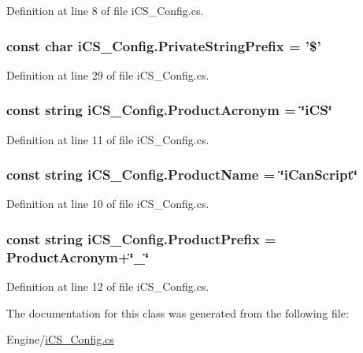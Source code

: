 Definition at line 8 of file i\+C\+S\+\_\+\+Config.\+cs.

\hypertarget{classi_c_s___config_a041043c87536d7d80dc01e3afb3c9300}{
\subsubsection[{Private\+String\+Prefix}]{\setlength{\rightskip}{0pt plus 5cm}const char i\+C\+S\+\_\+\+Config.\+Private\+String\+Prefix = '\$'}}\label{classi_c_s___config_a041043c87536d7d80dc01e3afb3c9300}


Definition at line 29 of file i\+C\+S\+\_\+\+Config.\+cs.

\hypertarget{classi_c_s___config_aadaab850be742d21b356bc7fcde2429e}{
\subsubsection[{Product\+Acronym}]{\setlength{\rightskip}{0pt plus 5cm}const string i\+C\+S\+\_\+\+Config.\+Product\+Acronym = \char`\"{}i\+C\+S\char`\"{}}}\label{classi_c_s___config_aadaab850be742d21b356bc7fcde2429e}


Definition at line 11 of file i\+C\+S\+\_\+\+Config.\+cs.

\hypertarget{classi_c_s___config_a237de99fe2941f28906828de3715218c}{
\subsubsection[{Product\+Name}]{\setlength{\rightskip}{0pt plus 5cm}const string i\+C\+S\+\_\+\+Config.\+Product\+Name = \char`\"{}i\+Can\+Script\char`\"{}}}\label{classi_c_s___config_a237de99fe2941f28906828de3715218c}


Definition at line 10 of file i\+C\+S\+\_\+\+Config.\+cs.

\hypertarget{classi_c_s___config_a649ce0774f2983687c1df5b557a85053}{
\subsubsection[{Product\+Prefix}]{\setlength{\rightskip}{0pt plus 5cm}const string i\+C\+S\+\_\+\+Config.\+Product\+Prefix = {\bf Product\+Acronym}+\char`\"{}\+\_\+\char`\"{}}}\label{classi_c_s___config_a649ce0774f2983687c1df5b557a85053}


Definition at line 12 of file i\+C\+S\+\_\+\+Config.\+cs.



The documentation for this class was generated from the following file\+:\begin{DoxyCompactItemize}
\item 
Engine/\hyperlink{i_c_s___config_8cs}{i\+C\+S\+\_\+\+Config.\+cs}\end{DoxyCompactItemize}
